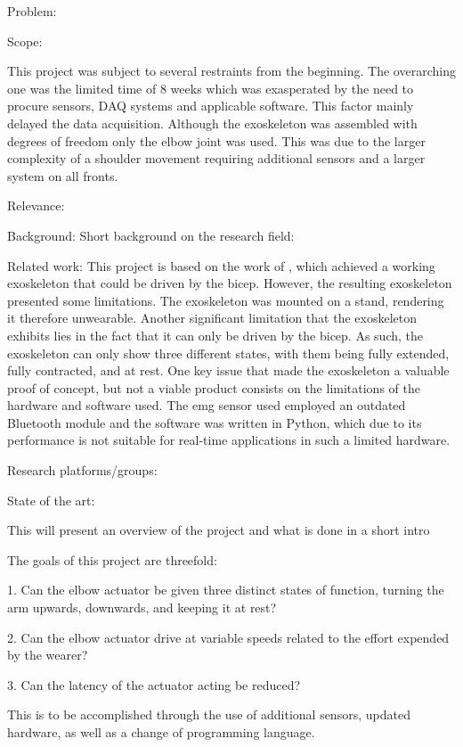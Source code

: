             Problem:
                

            Scope:

            This project was subject to several restraints from the beginning. The overarching one was the limited time of 8 weeks which was
            exasperated by the need to procure sensors, DAQ systems and applicable software. This factor mainly delayed the data acquisition. 
            Although the exoskeleton was assembled with degrees of freedom only the elbow joint was used. This was due to the larger complexity 
            of a shoulder movement requiring additional sensors and a larger system on all fronts.
            
            Relevance: %


Background: 
    Short background on the research field:

    Related work: %
        This project is based on the work of \cite{AFES}, which achieved a working exoskeleton that could be driven by the bicep. However, the resulting 
        exoskeleton presented some limitations. The exoskeleton was mounted on a stand, rendering it therefore unwearable. Another significant limitation 
        that the exoskeleton exhibits lies in the fact that it can only be driven by the bicep. As such, the exoskeleton can only show three different states, 
        with them being fully extended, fully contracted, and at rest. One key issue that made the exoskeleton a valuable proof of concept, but not a viable 
        product consists on the limitations of the hardware and software used. The \acs{emg} sensor used employed an outdated Bluetooth module and the software was 
        written in Python, which due to its performance is not suitable for real-time applications in such a limited hardware.

    Research platforms/groups:

    State of the art:


    This will present an overview of the project and what is done in a short intro


The goals of this project are threefold:

1. Can the elbow actuator be given three distinct states of function, turning the arm upwards, downwards, and keeping it at rest?

2. Can the elbow actuator drive at variable speeds related to the effort expended by the wearer?

3. Can the latency of the actuator acting be reduced?

This is to be accomplished through the use of additional sensors, updated hardware, as well as a change of programming language.